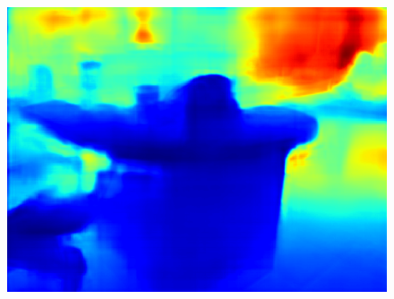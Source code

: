 \documentclass{svjour3}                     %
\begin{document}
\begin{figure}[t]
{\begin{minipage}[t]{0.15\linewidth}
  \includegraphics[width=1\linewidth]{images/nyu_without/kitchen_rgb_00850.png}
  \end{minipage}%
  }
\end{figure}
\end{document}

